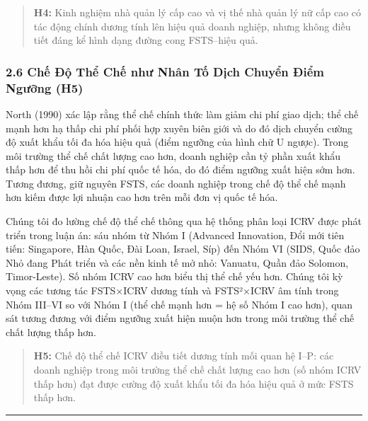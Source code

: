 \documentclass[12pt,a4paper]{article}
\begin{document}
\begin{quote}
\textbf{H4:} Kinh nghiệm nhà quản lý cấp cao và vị thế nhà quản lý nữ
cấp cao có tác động chính dương tính lên hiệu quả doanh nghiệp, nhưng
không điều tiết đáng kể hình dạng đường cong FSTS--hiệu quả.
\end{quote}

\hypertarget{26-chux1ebf-ux111ux1ed9-thux1ec3-chux1ebf-nhux1b0-nhuxe2n-tux1ed1-dux1ecbch-chuyux1ec3n-ux111iux1ec3m-ngux1b0ux1ee1ng-h5}{%
\subsubsection{2.6 Chế Độ Thể Chế như Nhân Tố Dịch Chuyển Điểm Ngưỡng
(H5)}\label{26-chux1ebf-ux111ux1ed9-thux1ec3-chux1ebf-nhux1b0-nhuxe2n-tux1ed1-dux1ecbch-chuyux1ec3n-ux111iux1ec3m-ngux1b0ux1ee1ng-h5}}

North (1990) xác lập rằng thể chế chính thức làm giảm chi phí giao dịch;
thể chế mạnh hơn hạ thấp chi phí phối hợp xuyên biên giới và do đó dịch
chuyển cường độ xuất khẩu tối đa hóa hiệu quả (điểm ngưỡng của hình chữ
U ngược). Trong môi trường thể chế chất lượng cao hơn, doanh nghiệp cần
tỷ phần xuất khẩu thấp hơn để thu hồi chi phí quốc tế hóa, do đó điểm
ngưỡng xuất hiện sớm hơn. Tương đương, giữ nguyên FSTS, các doanh nghiệp
trong chế độ thể chế mạnh hơn kiếm được lợi nhuận cao hơn trên mỗi đơn
vị quốc tế hóa.

Chúng tôi đo lường chế độ thể chế thông qua hệ thống phân loại ICRV được
phát triển trong luận án: sáu nhóm từ Nhóm I (Advanced Innovation, Đổi
mới tiên tiến: Singapore, Hàn Quốc, Đài Loan, Israel, Síp) đến Nhóm VI
(SIDS, Quốc đảo Nhỏ đang Phát triển và các nền kinh tế mở nhỏ: Vanuatu,
Quần đảo Solomon, Timor-Leste). Số nhóm ICRV cao hơn biểu thị thể chế
yếu hơn. Chúng tôi kỳ vọng các tương tác FSTS×ICRV dương tính và
FSTS²×ICRV âm tính trong Nhóm III--VI so với Nhóm I (thể chế mạnh hơn =
hệ số Nhóm I cao hơn), quan sát tương đương với điểm ngưỡng xuất hiện
muộn hơn trong môi trường thể chế chất lượng thấp hơn.

\begin{quote}
\textbf{H5:} Chế độ thể chế ICRV điều tiết dương tính mối quan hệ I--P:
các doanh nghiệp trong môi trường thể chế chất lượng cao hơn (số nhóm
ICRV thấp hơn) đạt được cường độ xuất khẩu tối đa hóa hiệu quả ở mức
FSTS thấp hơn.
\end{quote}

\begin{center}\rule{0.5\linewidth}{0.5pt}\end{center}
\end{document}
